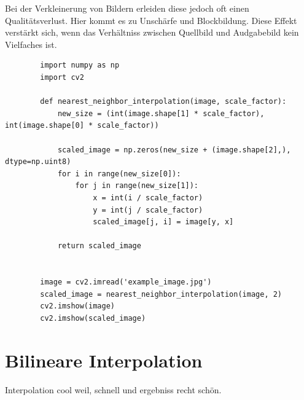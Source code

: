         
        Bei der Verkleinerung von Bildern erleiden diese jedoch oft einen Qualitätsverlust.
        Hier kommt es zu Unschärfe und Blockbildung. 
        Diese Effekt verstärkt sich, wenn das Verhältniss zwischen Quellbild und Audgabebild kein Vielfaches ist. 
        \begin{acronym}
        \end{acronym}
        \begin{lstlisting}
        import numpy as np
        import cv2
        
        def nearest_neighbor_interpolation(image, scale_factor):
            new_size = (int(image.shape[1] * scale_factor), int(image.shape[0] * scale_factor))
            
            scaled_image = np.zeros(new_size + (image.shape[2],), dtype=np.uint8)
            for i in range(new_size[0]):
                for j in range(new_size[1]):
                    x = int(i / scale_factor)
                    y = int(j / scale_factor)
                    scaled_image[j, i] = image[y, x]
            
            return scaled_image
        
        
        image = cv2.imread('example_image.jpg')
        scaled_image = nearest_neighbor_interpolation(image, 2)
        cv2.imshow(image)
        cv2.imshow(scaled_image)
        \end{lstlisting}
    \section{Bilineare Interpolation}
    
        Interpolation cool weil, schnell und ergebniss recht schön.

    

